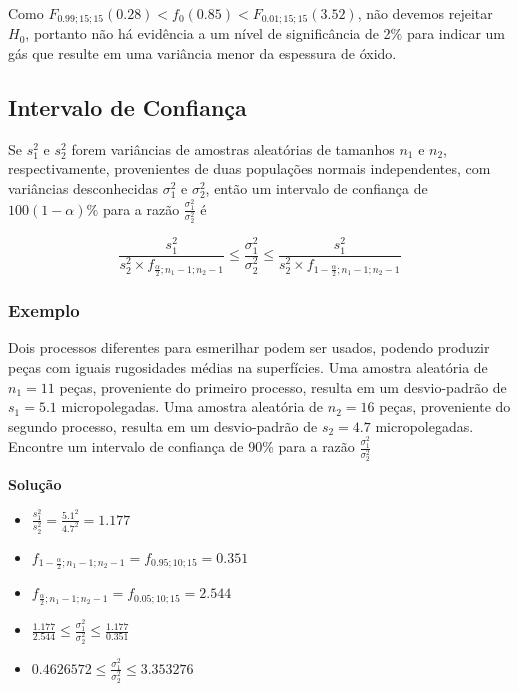 \documentclass[
]{book}
\providecommand{\tightlist}{%
  \setlength{\itemsep}{0pt}\setlength{\parskip}{0pt}}
\begin{document}
Como \(F_{0.99;15;15}(0.28)<f_0(0.85)<F_{0.01;15;15}(3.52)\), não devemos rejeitar \(H_0\), portanto não há evidência a um nível de significância de 2\% para indicar um gás que resulte em uma variância menor da espessura de óxido.

\hypertarget{intervalo-de-confianuxe7a-2}{%
\subsection{Intervalo de Confiança}\label{intervalo-de-confianuxe7a-2}}

Se \(s_1^2\) e \(s_2^2\) forem variâncias de amostras aleatórias de tamanhos \(n_1\) e \(n_2\), respectivamente, provenientes de duas populações normais independentes, com variâncias desconhecidas \(\sigma_1^2\) e \(\sigma_2^2\), então um intervalo de confiança de \(100(1-\alpha)\%\) para a razão \(\frac{\sigma^2_1}{\sigma^2_2}\) é

\[\frac{s_1^2}{s_2^2\times f_{\frac{\alpha}{2};n_1-1;n_2-1}}\leq \frac{\sigma^2_1}{\sigma^2_2} \leq \frac{s_1^2}{s_2^2\times f_{1-\frac{\alpha}{2};n_1-1;n_2-1}}\]

\hypertarget{exemplo-16}{%
\subsubsection{Exemplo}\label{exemplo-16}}

Dois processos diferentes para esmerilhar podem ser usados, podendo produzir peças com iguais rugosidades médias na superfícies. Uma amostra aleatória de \(n_1=11\) peças, proveniente do primeiro processo, resulta em um desvio-padrão de \(s_1=5.1\) micropolegadas. Uma amostra aleatória de \(n_2=16\) peças, proveniente do segundo processo, resulta em um desvio-padrão de \(s_2=4.7\) micropolegadas. Encontre um intervalo de confiança de 90\% para a razão \(\frac{\sigma^2_1}{\sigma^2_2}\)

\textbf{Solução}

\begin{itemize}
\tightlist
\item
  \(\frac{s_1^2}{s_2^2}=\frac{5.1^2}{4.7^2}=1.177\)
\item
  \(f_{1-\frac{\alpha}{2};n_1-1;n_2-1}=f_{0.95;10;15}=0.351\)
\item
  \(f_{\frac{\alpha}{2};n_1-1;n_2-1}=f_{0.05;10;15}=2.544\)
\item
  \(\frac{1.177}{2.544} \leq \frac{\sigma^2_1}{\sigma^2_2} \leq \frac{1.177}{0.351}\)
\item
  \(0.4626572 \leq \frac{\sigma^2_1}{\sigma^2_2} \leq 3.353276\)
\end{itemize}
\end{document}
